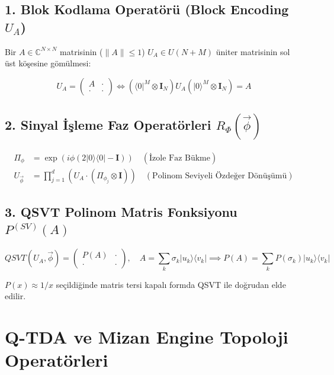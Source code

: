 \documentclass[11pt, a4paper]{article}
\begin{document}
\subsection{1. Blok Kodlama Operatörü (Block Encoding $U_A$)}
Bir $A \in \mathbb{C}^{N \times N}$ matrisinin ($\|A\| \le 1$) $U_A \in U(N+M)$ üniter matrisinin sol üst köşesine gömülmesi:

\begin{equation}
U_A = \begin{pmatrix} A & \cdot \\ \cdot & \cdot \end{pmatrix} \iff (\langle 0|^M \otimes \mathbf{I}_N) U_A (|0\rangle^M \otimes \mathbf{I}_N) = A
\end{equation}

\subsection{2. Sinyal İşleme Faz Operatörleri $R_\Phi(\vec{\phi})$}
\begin{align}
\Pi_\phi &= \exp(i \phi (2 |0\rangle\langle 0| - \mathbf{I})) \quad (\text{İzole Faz Bükme}) \\
U_{\vec{\phi}} &= \prod_{j=1}^d \left( U_A \cdot (\Pi_{\phi_j} \otimes \mathbf{I}) \right) \quad (\text{Polinom Seviyeli Özdeğer Dönüşümü})
\end{align}

\subsection{3. QSVT Polinom Matris Fonksiyonu $P^{(SV)}(A)$}
\begin{equation}
QSVT(U_A, \vec{\phi}) = \begin{pmatrix} P(A) & \cdot \\ \cdot & \cdot \end{pmatrix}, \quad A = \sum_k \sigma_k |u_k\rangle \langle v_k| \implies P(A) = \sum_k P(\sigma_k) |u_k\rangle \langle v_k|
\end{equation}

$P(x) \approx 1/x$ seçildiğinde matris tersi kapalı formda QSVT ile doğrudan elde edilir.

\section{Q-TDA ve Mizan Engine Topoloji Operatörleri}
\end{document}
